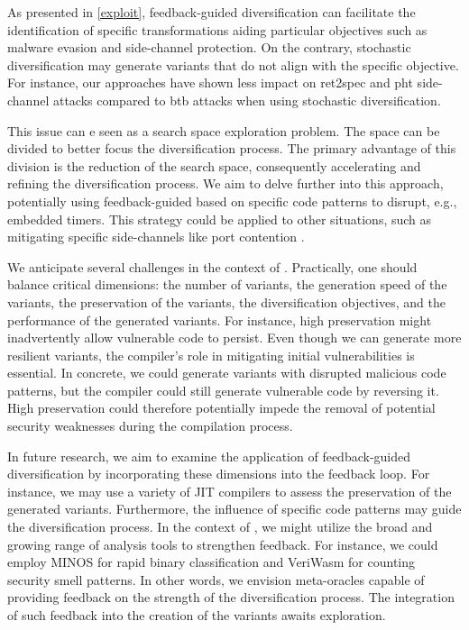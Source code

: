     
\begin{strategy}
As presented in \autoref{exploit}, feedback-guided diversification can facilitate the identification of specific transformations aiding particular objectives such as malware evasion and side-channel protection. 
On the contrary, stochastic diversification may generate variants that do not align with the specific objective. 
For instance, our approaches have shown less impact on ret2spec and pht side-channel attacks compared to btb attacks when using stochastic diversification.


This issue can e seen as a search space exploration problem.
The space can be divided to better focus the diversification process. 
The primary advantage of this division is the reduction of the search space, consequently accelerating and refining the diversification process. 
We aim to delve further into this approach, potentially using feedback-guided based on specific code patterns to disrupt, e.g., embedded timers. 
This strategy could be applied to other situations, such as mitigating specific side-channels like port contention \cite{10.1145/3488932.3517411}.

We anticipate several challenges in the context of \Wasm. 
Practically, one should balance critical dimensions: the number of variants, the generation speed of the variants, the preservation of the variants, the diversification objectives, and the performance of the generated variants. 
For instance, high preservation might inadvertently allow vulnerable code to persist. 
Even though we can generate more resilient variants, the compiler's role in mitigating initial vulnerabilities is essential.
In concrete, we could generate variants with disrupted malicious code patterns, but the compiler could still generate vulnerable code by reversing it. 
High preservation could therefore potentially impede the removal of potential security weaknesses during the compilation process.

In future research, we aim to examine the application of feedback-guided diversification by incorporating these dimensions into the feedback loop. 
For instance, we may use a variety of \Wasm JIT compilers\cite{2023arXiv230513241T} to assess the preservation of the generated variants. 
Furthermore, the influence of specific code patterns may guide the diversification process. 
In the context of \Wasm, we might utilize the broad and growing range of analysis tools to strengthen feedback.
For instance, we could employ MINOS \cite{MINOS} for rapid binary classification and VeriWasm\cite{veriwasm} for counting security smell patterns.
In other words, we envision meta-oracles capable of providing feedback on the strength of the diversification process.
The integration of such feedback into the creation of the \Wasm variants awaits exploration.




\end{strategy}